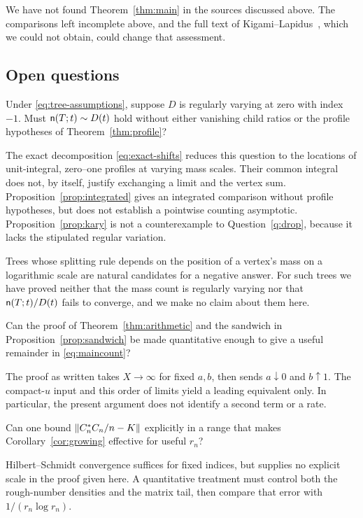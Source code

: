 We have not found Theorem~\ref{thm:main} in the sources discussed above.
The comparisons left incomplete above, and the full text of
Kigami--Lapidus~\cite{KL}, which we could not obtain, could change that
assessment.

\subsection{Open questions}
\begin{question}\label{q:drop}
Under \eqref{eq:tree-assumptions}, suppose $D$ is regularly varying at
zero with index $-1$. Must $\mathsf n(T;t)\sim D(t)$ hold without either
vanishing child ratios or the profile hypotheses of
Theorem~\ref{thm:profile}?
\end{question}

The exact decomposition \eqref{eq:exact-shifts} reduces this question to
the locations of unit-integral, zero--one profiles at varying mass scales.
Their common integral does not, by itself, justify exchanging a limit
and the vertex sum. Proposition~\ref{prop:integrated} gives an integrated
comparison without profile hypotheses, but does not establish a pointwise
counting asymptotic. Proposition~\ref{prop:kary} is not a counterexample to
Question~\ref{q:drop}, because it lacks the stipulated regular variation.

Trees whose splitting rule depends on the position of a vertex's mass on
a logarithmic scale are natural candidates for a negative answer. For such
trees we have proved neither that the mass count is regularly varying nor
that $\mathsf n(T;t)/D(t)$ fails to converge, and we make no claim about
them here.

\begin{question}
Can the proof of Theorem~\ref{thm:arithmetic} and the sandwich in
Proposition~\ref{prop:sandwich} be made quantitative enough to give a
useful remainder in \eqref{eq:maincount}?
\end{question}
The proof as written takes $X\to\infty$ for fixed $a,b$, then sends
$a\downarrow0$ and $b\uparrow1$. The compact-$u$ input and this order
of limits yield a leading equivalent only. In particular, the present
argument does not identify a second term or a rate.

\begin{question}
Can one bound $\left\lVert C_n^*C_n/n-K\right\rVert$ explicitly in a range that makes
Corollary~\ref{cor:growing} effective for useful $r_n$?
\end{question}
Hilbert--Schmidt convergence suffices for fixed indices, but supplies no
explicit scale in the proof given here. A quantitative treatment must
control both the rough-number densities and the matrix tail, then compare
that error with $1/(r_n\log r_n)$.

